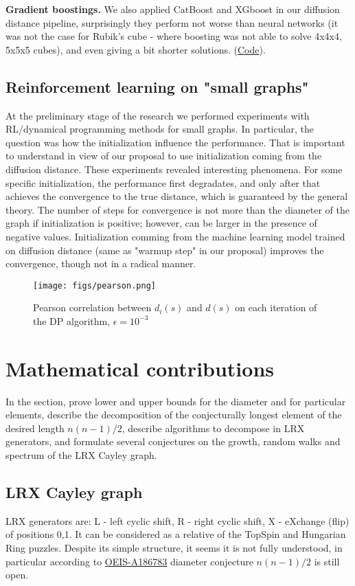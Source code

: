 \documentclass[atmp]{ipart_v1}
\numberwithin{equation}{section}
\theoremstyle{plain}%
\begin{document}
{\bf Gradient boostings.} We also applied CatBoost and XGboost in our diffusion distance pipeline, surprisingly they perform not worse than neural networks (it was not the case for Rubik's cube - where boosting was not able to solve 4x4x4, 5x5x5 cubes), and even giving a bit shorter solutions. 
(\href{https://www.kaggle.com/code/antoninadolgorukova/lrx-gbm-powered-pathfinding}{Code}).

\subsection{Reinforcement learning on "small graphs"}
At the preliminary stage of the research we performed experiments with RL/dynamical programming methods for small graphs. In particular, the question was how the initialization influence the performance. That is important to understand in view of our proposal to use initialization coming from the diffusion distance.
These experiments revealed interesting phenomena. 
For some specific initialization, the performance first degradates, and only after that achieves the convergence to the true distance, which is guaranteed by the general theory. The number of steps for convergence is not more than the diameter of the graph if initialization is positive; however, can be larger in the presence of negative values. Initialization comming from the machine learning model trained on diffusion distance (same as "warmup step" in our proposal) improves the convergence, though not in a radical manner. 

\begin{figure}[h]
  \centering
  \texttt{[image: figs/pearson.png]}
  \caption{Pearson correlation between $d_i(s)$ and $d(s)$ on each iteration of the DP algorithm, $\epsilon = 10^{-3}$}\label{fig:pearson}
\end{figure}

\section{Mathematical contributions}
In the section, prove lower and upper bounds for the diameter and for particular elements, describe the decomposition of the conjecturally longest element of the desired length $n(n-1)/2$, describe algorithms to decompose in LRX generators, and formulate several conjectures on the growth, random walks and spectrum of the LRX Cayley graph. 

\subsection{LRX Cayley graph}
LRX generators are:  L - left cyclic shift, R - right cyclic shift, X - eXchange (flip) of positions 0,1. It can be considered as a relative of the TopSpin and Hungarian Ring puzzles. Despite its simple structure, it seems it is not fully understood, in particular according to \href{https://oeis.org/A186783}{OEIS-A186783} diameter conjecture $n(n-1)/2$ is still open. 
\end{document}
